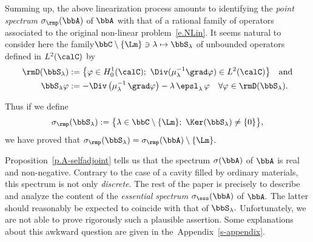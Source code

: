 Summing up, the above linearization process amounts to identifying the \emph{point spectrum} $\sigma_{\rmp}(\bbA)$ of $\bbA$ with that of a rational family of operators associated to the original non-linear problem~\eqref{e.NLin}. It seems natural to consider here the family\linebreak$\bbC\setminus\{\Lm\} \ni \lambda \mapsto \bbS_\lambda$ of unbounded operators defined in $L^2(\calC)$ by
\begin{align}
\rmD(\bbS_\lambda) & := \big\{ \varphi \in H^1_0(\calC); \ \Div(\mu_\lambda^{-1}\grad \varphi) \in L^2(\calC) \big\} \quad \text{and} \label{e.def-DomS}
\\
\bbS_\lambda \varphi & := -\Div \left(\mu_\lambda^{-1}\, \grad\varphi \right) - \lambda\,\epsl_\lambda\,\varphi
\quad\forall \varphi \in \rmD(\bbS_\lambda). \label{e.def-S}
\end{align}

Thus if we define
\begin{equation}
\sigma_{\rmp}(\bbS_\lambda) := \big\{ \lambda \in \bbC\setminus\{\Lm\};\ \Ker(\bbS_\lambda)\neq\{0\} \big\},\label{e.spectre-ponct-S}
\end{equation}
we have proved that $\sigma_{\rmp}(\bbS_\lambda) = \sigma_{\rmp}(\bbA)\setminus\{\Lm\}.$

Proposition~\ref{p.A-selfadjoint} tells us that the spectrum $\sigma(\bbA)$ of $\bbA$ is real and non-negative. Contrary to the case of a cavity filled by ordinary materials, this spectrum is not only \emph{discrete}. The rest of the paper is precisely to describe and analyze the content of the \emph{essential spectrum} $\sigma_{\ess}(\bbA)$ of $\bbA.$ The latter should reasonably be expected to coincide with that of $\bbS_\lambda.$ Unfortunately, we are not able to prove rigorously such a plausible assertion. Some explanations about this awkward question are given in the~Appendix~\ref{s-appendix}.

